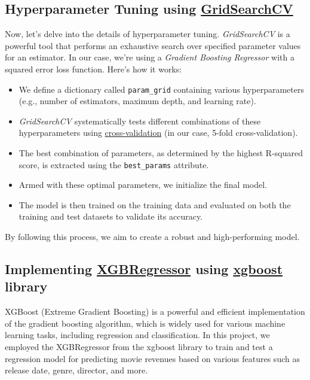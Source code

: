 \documentclass[conference]{IEEEtran}
\begin{document}
    \subsection{Hyperparameter Tuning using \href{https://scikit-learn.org/stable/modules/generated/sklearn.model_selection.GridSearchCV.html}{GridSearchCV}}
    
    Now, let's delve into the details of hyperparameter tuning. \textit{GridSearchCV} is a powerful tool that performs an exhaustive search over specified parameter values for an estimator. In our case, we're using a \textit{Gradient Boosting Regressor} with a squared error loss function. Here's how it works:
    
    \begin{itemize}
        \item We define a dictionary called \texttt{param\_grid} containing various hyperparameters (e.g., number of estimators, maximum depth, and learning rate).
        \item \textit{GridSearchCV} systematically tests different combinations of these hyperparameters using \href{https://scikit-learn.org/stable/modules/cross_validation.html}{cross-validation} (in our case, 5-fold cross-validation).
        \item The best combination of parameters, as determined by the highest R-squared score, is extracted using the \texttt{best\_params} attribute.
        \item Armed with these optimal parameters, we initialize the final model.
        \item The model is then trained on the training data and evaluated on both the training and test datasets to validate its accuracy.
    \end{itemize}
    
    By following this process, we aim to create a robust and high-performing model.

    \subsection{Implementing \href{https://xgboost.readthedocs.io/en/latest/python/python_api.html}{XGBRegressor} using \href{https://xgboost.readthedocs.io/en/stable/}{xgboost} library}
    XGBoost (Extreme Gradient Boosting) is a powerful and efficient implementation of the gradient boosting algorithm, which is widely used for various machine learning tasks, including regression and classification. In this project, we employed the XGBRegressor from the xgboost library to train and test a regression model for predicting movie revenues based on various features such as release date, genre, director, and more.
    
\end{document}
